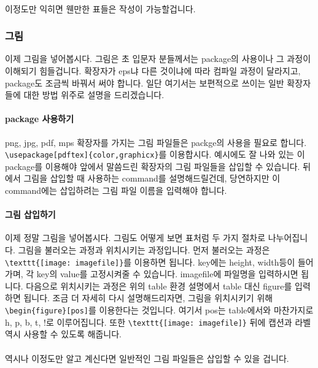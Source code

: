 \paragraph{}
이정도만 익히면 웬만한 표들은 작성이 가능할겁니다.

\subsubsection{그림}
이제 그림을 넣어봅시다.
그림은 초 입문자 분들께서는 package의 사용이나 그 과정이 이해되기 힘들겁니다.
확장자가 eps냐 다른 것이냐에 따라 컴파일 과정이 달라지고, package도 조금씩 바꿔서 써야 합니다.
일단 여기서는 보편적으로 쓰이는 일반 확장자들에 대한 방법 위주로 설명을 드리겠습니다.

\paragraph{package 사용하기}
png, jpg, pdf, mps 확장자를 가지는 그림 파일들은 packge의 사용을 필요로 합니다.
\verb|\usepackage[pdftex]{color,graphicx}|를 이용합시다.
예시에도 잘 나와 있는 이 package를 이용해야 앞에서 말씀드린 확장자의 그림 파일들을 삽입할 수 있습니다.
뒤에서 그림을 삽입할 때 사용하는 command를 설명해드릴건데, 당연하지만 이 command에는 삽입하려는 그림 파일 이름을 입력해야 합니다.

\paragraph{그림 삽입하기}
이제 정말 그림을 넣어봅시다.
그림도 어떻게 보면 표처럼 두 가지 절차로 나누어집니다.
그림을 불러오는 과정과 위치시키는 과정입니다.
먼저 불러오는 과정은 \verb|\texttt{[image: imagefile]}|를 이용하면 됩니다.
key에는 height, width등이 들어가며, 각 key의 value를 고정시켜줄 수 있습니다.
imagefile에 파일명을 입력하시면 됩니다.
다음으로 위치시키는 과정은 위의 table 환경 설명에서 table 대신 figure를 입력하면 됩니다.
조금 더 자세히 다시 설명해드리자면, 그림을 위치시키기 위해 \verb|\begin{figure}[pos]|를 이용한다는 것입니다.
여기서 pos는 table에서와 마찬가지로 h, p, b, t, !로 이루어집니다.
또한 \verb|\texttt{[image: imagefile]}| 뒤에 캡션과 라벨 역시 사용할 수 있도록 해줍니다.

\paragraph{}
역시나 이정도만 알고 계신다면 일반적인 그림 파일들은 삽입할 수 있을 겁니다.

